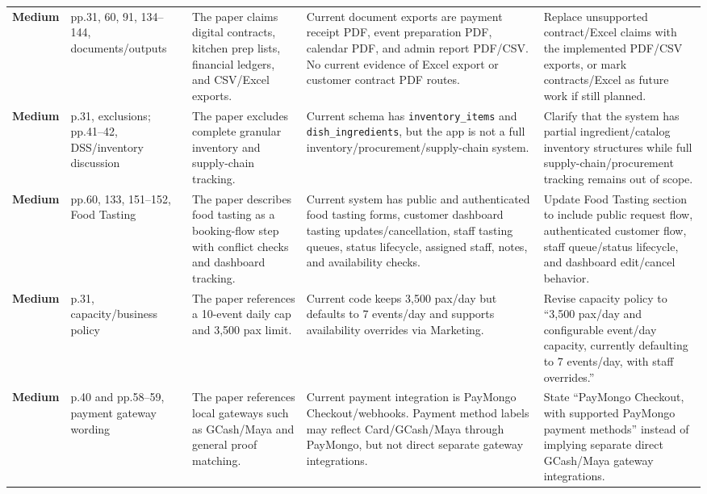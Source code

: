 \documentclass[11pt]{article}
\newcommand{\severitymedium}{\textcolor{medium}{\textbf{Medium}}}
\begin{document}
\begin{landscape}
\begin{longtable}{L{0.72in} L{1.05in} L{2.05in} L{2.55in} L{2.55in}}
\severitymedium & pp.31, 60, 91, 134--144, documents/outputs & The paper claims digital contracts, kitchen prep lists, financial ledgers, and CSV/Excel exports. & Current document exports are payment receipt PDF, event preparation PDF, calendar PDF, and admin report PDF/CSV. No current evidence of Excel export or customer contract PDF routes. & Replace unsupported contract/Excel claims with the implemented PDF/CSV exports, or mark contracts/Excel as future work if still planned. \\

\severitymedium & p.31, exclusions; pp.41--42, DSS/inventory discussion & The paper excludes complete granular inventory and supply-chain tracking. & Current schema has \texttt{inventory\_items} and \texttt{dish\_ingredients}, but the app is not a full inventory/procurement/supply-chain system. & Clarify that the system has partial ingredient/catalog inventory structures while full supply-chain/procurement tracking remains out of scope. \\

\severitymedium & pp.60, 133, 151--152, Food Tasting & The paper describes food tasting as a booking-flow step with conflict checks and dashboard tracking. & Current system has public and authenticated food tasting forms, customer dashboard tasting updates/cancellation, staff tasting queues, status lifecycle, assigned staff, notes, and availability checks. & Update Food Tasting section to include public request flow, authenticated customer flow, staff queue/status lifecycle, and dashboard edit/cancel behavior. \\

\severitymedium & p.31, capacity/business policy & The paper references a 10-event daily cap and 3,500 pax limit. & Current code keeps 3,500 pax/day but defaults to 7 events/day and supports availability overrides via Marketing. & Revise capacity policy to ``3,500 pax/day and configurable event/day capacity, currently defaulting to 7 events/day, with staff overrides.'' \\

\severitymedium & p.40 and pp.58--59, payment gateway wording & The paper references local gateways such as GCash/Maya and general proof matching. & Current payment integration is PayMongo Checkout/webhooks. Payment method labels may reflect Card/GCash/Maya through PayMongo, but not direct separate gateway integrations. & State ``PayMongo Checkout, with supported PayMongo payment methods'' instead of implying separate direct GCash/Maya gateway integrations. \\


\end{longtable}
\end{landscape}
\end{document}
